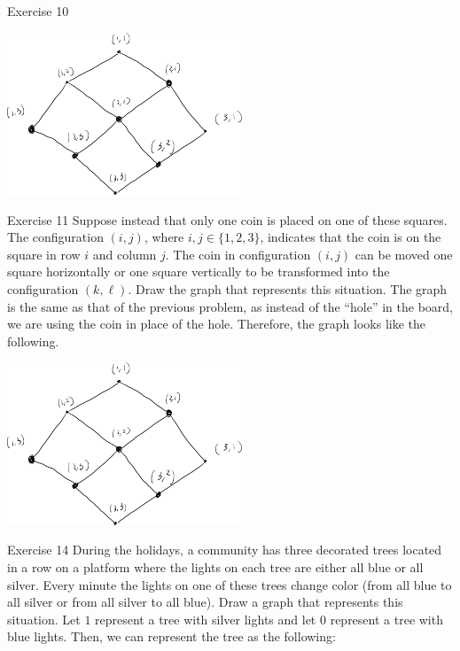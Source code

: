 \documentclass[8pt]{extarticle}
\begin{document}
{\begin{problem}{Exercise 10}
\begin{center}
    \end{center}
    \tcblower
    \begin{center}
      \includegraphics[width=7cm]{exercise_10_solution}
    \end{center}
  \end{problem}
  \begin{problem}{Exercise 11}
    Suppose instead that only one coin is placed on one of these squares. The configuration $(i,j)$, where $i,j\in \{1,2,3\}$, indicates that the coin is on the square in row $i$ and column $j$. The coin in configuration $(i,j)$ can be moved one square horizontally or one square vertically to be transformed into the configuration $(k,\ell)$. Draw the graph that represents this situation.
    \tcblower
    The graph is the same as that of the previous problem, as instead of the ``hole'' in the board, we are using the coin in place of the hole. Therefore, the graph looks like the following.
    \begin{center}
      \includegraphics[width=7cm]{exercise_10_solution}
    \end{center}
  \end{problem}
  \begin{problem}{Exercise 14}
    During the holidays, a community has three decorated trees located in a row on a platform where the lights on each tree are either all blue or all silver. Every minute the lights on one of these trees change color (from all blue to all silver or from all silver to all blue). Draw a graph that represents this situation.
    \tcblower
    Let $1$ represent a tree with silver lights and let $0$ represent a tree with blue lights. Then, we can represent the tree as the following:

\end{problem}}
\end{document}
